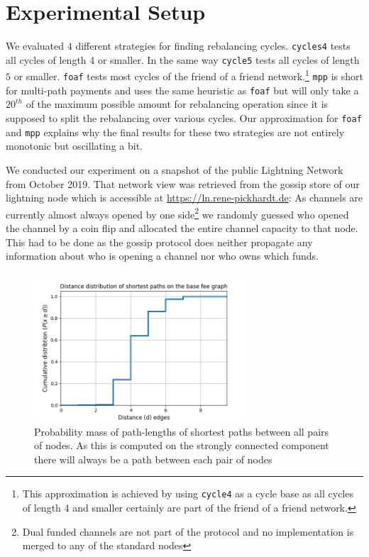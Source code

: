 \documentclass[conference]{IEEEtran}
\begin{document}
\section{Experimental Setup}
\label{sec:setup}

We evaluated $4$ different strategies for finding rebalancing cycles. \texttt{cycles4} tests all cycles of length $4$ or smaller. In the same way \texttt{cycle5} tests all cycles of length $5$ or smaller. \texttt{foaf} tests most cycles of the friend of a friend network.\footnote{This approximation is achieved by using \texttt{cycle4} as a cycle base as all cycles of length 4 and smaller certainly are part of the friend of a friend network.}
\texttt{mpp} is short for multi-path payments and uses the same heuristic as \texttt{foaf} but will only take a $20^{th}$ of the maximum possible amount for rebalancing operation since it is supposed to split the rebalancing over various cycles.
Our approximation for \texttt{foaf} and \texttt{mpp} explains why the final results for these two strategies are not entirely monotonic but oscillating a bit.

We conducted our experiment on a snapshot of the public Lightning Network from October 2019.
That network view was retrieved from the gossip store of our lightning node which is accessible at \url{https://ln.rene-pickhardt.de}:
As channels are currently almost always opened by one side\footnote{Dual funded channels are not part of the protocol and no implementation is merged to any of the standard nodes} we randomly guessed who opened the channel by a coin flip and allocated the entire channel capacity to that node.
This had to be done as the gossip protocol does neither propagate any information about who is opening a channel nor who owns which funds.

\begin{figure}
 \centering
 \includegraphics[width=8cm]{code/vs/fig/cummulative_distance_distribution_lin_scale.png}
 \caption{Probability mass of path-lengths of shortest paths between all pairs of nodes. As this is computed on the strongly connected component there will always be a path between each pair of nodes}
 \label{fig:cumulative_distance}
\end{figure}
\end{document}
